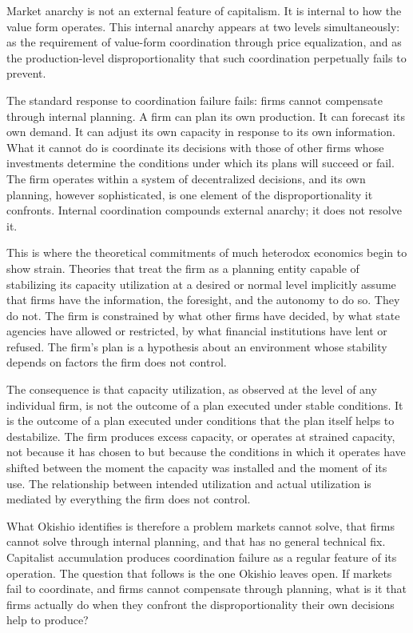 Market anarchy is not an external feature of capitalism. It is internal to how the value form operates. This internal anarchy appears at two levels simultaneously: as the requirement of value-form coordination through price equalization, and as the production-level disproportionality that such coordination perpetually fails to prevent.

The standard response to coordination failure fails: firms cannot compensate through internal planning. A firm can plan its own production. It can forecast its own demand. It can adjust its own capacity in response to its own information. What it cannot do is coordinate its decisions with those of other firms whose investments determine the conditions under which its plans will succeed or fail. The firm operates within a system of decentralized decisions, and its own planning, however sophisticated, is one element of the disproportionality it confronts. Internal coordination compounds external anarchy; it does not resolve it.

This is where the theoretical commitments of much heterodox economics begin to show strain. Theories that treat the firm as a planning entity capable of stabilizing its capacity utilization at a desired or normal level implicitly assume that firms have the information, the foresight, and the autonomy to do so. They do not. The firm is constrained by what other firms have decided, by what state agencies have allowed or restricted, by what financial institutions have lent or refused. The firm's plan is a hypothesis about an environment whose stability depends on factors the firm does not control.

The consequence is that capacity utilization, as observed at the level of any individual firm, is not the outcome of a plan executed under stable conditions. It is the outcome of a plan executed under conditions that the plan itself helps to destabilize. The firm produces excess capacity, or operates at strained capacity, not because it has chosen to but because the conditions in which it operates have shifted between the moment the capacity was installed and the moment of its use. The relationship between intended utilization and actual utilization is mediated by everything the firm does not control.

What Okishio identifies is therefore a problem markets cannot solve, that firms cannot solve through internal planning, and that has no general technical fix. Capitalist accumulation produces coordination failure as a regular feature of its operation. The question that follows is the one Okishio leaves open. If markets fail to coordinate, and firms cannot compensate through planning, what is it that firms actually do when they confront the disproportionality their own decisions help to produce?

